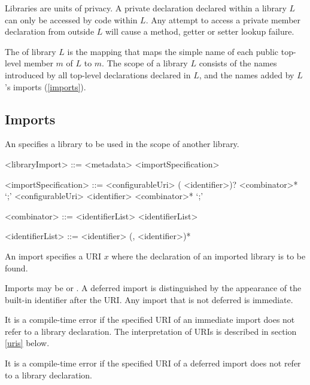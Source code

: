 \documentclass[makeidx]{article}
\begin{document}
{\LMHash{}%
Libraries are units of privacy.
A private declaration declared within a library $L$ can only be accessed by code within $L$.
Any attempt to access a private member declaration from outside $L$ will cause a method, getter or setter lookup failure.


\LMHash{}%
The  of library $L$ is the mapping that maps the simple name of each public top-level member $m$ of $L$ to $m$.
The scope of a library $L$ consists of the names introduced by all top-level declarations declared in $L$, and the names added by $L$'s imports (\ref{imports}).


\subsection{Imports}

\LMHash{}%
An  specifies a library to be used in the scope of another library.
\begin{grammar}
<libraryImport> ::= <metadata> <importSpecification>

<importSpecification> ::= \gnewline{}
  \IMPORT{} <configurableUri> (\AS{} <identifier>)? <combinator>* `;'
  \alt \IMPORT{} <configurableUri> \DEFERRED{} \AS{} <identifier> <combinator>* `;'

<combinator> ::= \SHOW{} <identifierList>
  \alt \HIDE{} <identifierList>

<identifierList> ::= <identifier> (, <identifier>)*
\end{grammar}

\LMHash{}%
An import specifies a URI $x$ where the declaration of an imported library is to be found.

\LMHash{}%
Imports may be
 or
.
A deferred import is distinguished by the appearance of the built-in identifier \DEFERRED{} after the URI.
Any import that is not deferred is immediate.

\LMHash{}%
It is a compile-time error if the specified URI of an immediate import does not refer to a library declaration.
The interpretation of URIs is described in section \ref{uris} below.

\LMHash{}%
It is a compile-time error if the specified URI of a deferred import does not refer to a library declaration.

}
\end{document}
